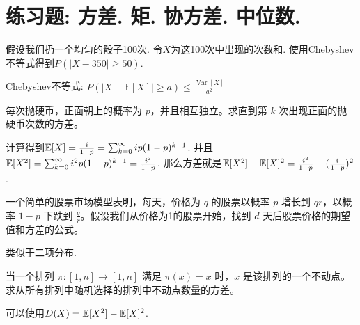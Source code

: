 \section*{练习题: 方差. 矩. 协方差. 中位数.}
\begin{exercise}
    假设我们扔一个均匀的骰子100次. 令$X$为这100次中出现的次数和. 使用Chebyshev不等式得到$P(|X-350| \geq 50)$.
\end{exercise}
\begin{solution*}
    Chebyshev不等式: $P(|X-\mathbb{E}[X]| \geq a) \leq \frac{\operatorname{Var}[X]}{a^2}$
\end{solution*}

\begin{exercise}
    每次抛硬币，正面朝上的概率为 \(p\)，并且相互独立。求直到第 \(k\) 次出现正面的抛硬币次数的方差。 
\end{exercise}

\begin{solution*}
    计算得到$\mathbb E[X]=\frac{i}{1-p}=\sum_{k=0}^{\infty} i p (1 - p)^{k - 1}$. 并且$\mathbb E[X^2]=\sum_{k=0}^{\infty} i^2 p (1 - p)^{k - 1}=\frac{i^2}{1-p}$. 那么方差就是$\mathbb E[X^2]-\mathbb E[X]^2=\frac{i^2}{1-p}-(\frac{i}{1-p})^2$.
\end{solution*}

\begin{exercise}
一个简单的股票市场模型表明，每天，价格为 \( q \) 的股票以概率 \( p \) 增长到 \( qr \)，以概率 \( 1 - p \) 下跌到 \( \frac{q}{r} \)。假设我们从价格为1的股票开始，找到 \( d \) 天后股票价格的期望值和方差的公式。
\end{exercise}

\begin{solution*}
    类似于二项分布. 
\end{solution*}

\begin{exercise}
    当一个排列 \(\pi: [1, n] \rightarrow [1, n]\) 满足 \(\pi (x) = x\) 时，\(x\) 是该排列的一个不动点。求从所有排列中随机选择的排列中不动点数量的方差。
\end{exercise}

\begin{solution*}
    可以使用$D(X)=\mathbb E[X^2]-\mathbb E[X]^2$.
\end{solution*}

